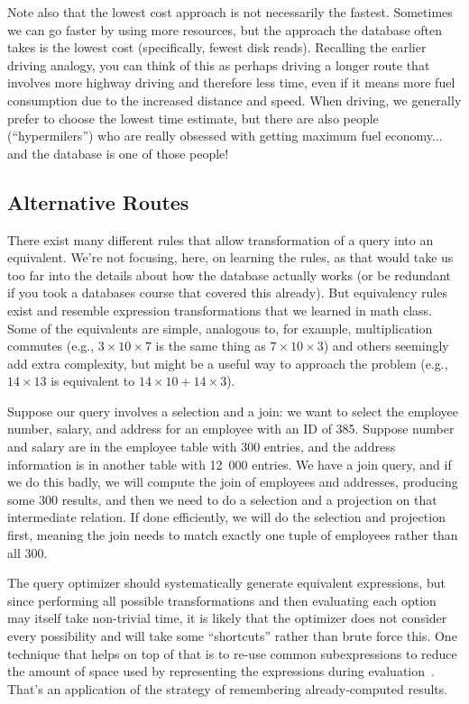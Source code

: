 Note also that the lowest cost approach is not necessarily the fastest. Sometimes we can go faster by using more resources, but the approach the database often takes is the lowest cost (specifically, fewest disk reads). Recalling the earlier driving analogy, you can think of this as perhaps driving a longer route that involves more highway driving and therefore less time, even if it means more fuel consumption due to the increased distance and speed. When driving, we generally prefer to choose the lowest time estimate, but there are also people (``hypermilers'') who are really obsessed with getting maximum fuel economy... and the database is one of those people!

\subsection*{Alternative Routes}
There exist many different rules that allow transformation of a query into an equivalent. We're not focusing, here, on learning the rules, as that would take us too far into the details about how the database actually works (or be redundant if you took a databases course that covered this already). But equivalency rules exist and resemble expression transformations that we learned in math class. Some of the equivalents are simple, analogous to, for example, multiplication commutes (e.g., $3 \times 10 \times 7$ is the same thing as $7 
\times 10 \times 3$) and others seemingly add extra complexity, but might be a useful way to approach the problem (e.g., $14 \times 13$ is equivalent to $14 \times 10 + 14 \times 3$). 

Suppose our query involves a selection and a join: we want to select the employee number, salary, and address for an employee with an ID of 385. Suppose number and salary are in the employee table with 300 entries, and the address information is in another table with 12~000 entries. We have a join query, and if we do this badly, we will compute the join of employees and addresses, producing some 300 results, and then we need to do a selection and a projection on that intermediate relation. If done efficiently, we will do the selection and projection first, meaning the join needs to match exactly one tuple of employees rather than all 300. 

The query optimizer should systematically generate equivalent expressions, but since performing all possible transformations and then evaluating each option may itself take non-trivial time, it is likely that the optimizer does not consider every possibility and will take some ``shortcuts'' rather than brute force this. One technique that helps on top of that is to re-use common subexpressions to reduce the amount of space used by representing the expressions during evaluation~\cite{dsc}. That's an application of the strategy of remembering already-computed results.

